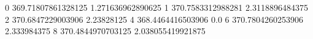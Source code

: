 0 369.71807861328125 1.271636962890625
1 370.7583312988281 2.3118896484375
2 370.6847229003906 2.23828125
4 368.4464416503906 0.0
6 370.7804260253906 2.333984375
8 370.4844970703125 2.038055419921875
